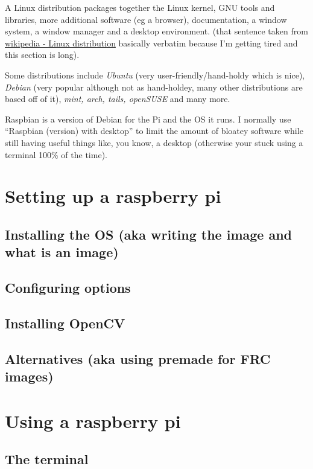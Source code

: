 \documentclass[11pt, titlepage]{article}
\begin{document}
A Linux distribution packages together the Linux kernel, GNU tools and libraries, more additional software (eg a browser), documentation, a window system, a window manager and a desktop environment. (that sentence taken from \href{https://en.wikipedia.org/wiki/Linux_distribution}{wikipedia - Linux distribution} basically verbatim because I'm getting tired and this section is long).

Some distributions include \emph{Ubuntu} (very user-friendly/hand-holdy which is nice), \emph{Debian} (very popular although not as hand-holdey, many other distributions are based off of it), \emph{mint, arch, tails, openSUSE} and many more.

Raspbian is a version of Debian for the Pi and the OS it runs. I normally use ``Raspbian (version) with desktop'' to limit the amount of bloatey software while still having useful things like, you know, a desktop (otherwise your stuck using a terminal 100\% of the time).

\section{Setting up a raspberry pi}
\label{sec:Setting_up_RPI}
\subsection{Installing the OS (aka writing the image and what is an image)}
\label{sec:SURPI_install_OS}
\subsection{Configuring options}
\label{sec:SURPI_configure}
\subsection{Installing OpenCV}
\label{sec:SURPI_install_opencv}
\subsection{Alternatives (aka using premade for FRC images)}
\label{sec:SURPI_setup_alternatives}

\section{Using a raspberry pi}
\label{sec:Using_RPI}
\subsection{The terminal}
\label{sec:URPI_terminal}
\end{document}
